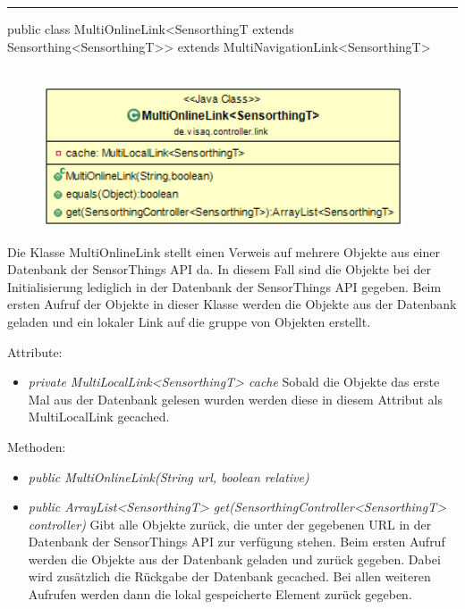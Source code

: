 \rule{\textwidth}{0.4pt}
public class MultiOnlineLink<SensorthingT extends Sensorthing<SensorthingT>> extends MultiNavigationLink<SensorthingT>
\\\\
\begin{minipage}{0.5\textwidth}
    \begin{figure}[H]
        {\centering\includegraphics[width=0.95\textwidth]{media/backend/controller/classes/MultiOnlineLink.png}}
    \end{figure}
    \end{minipage} \hfill
\begin{minipage}{0.5\textwidth}
    Die Klasse MultiOnlineLink stellt einen Verweis auf mehrere Objekte aus einer Datenbank der \gls{SensorThings API} da.
    In diesem Fall sind die Objekte bei der Initialisierung lediglich in der Datenbank der \gls{SensorThings API} gegeben.
    Beim ersten Aufruf der Objekte in dieser Klasse werden die Objekte aus der Datenbank geladen und ein lokaler Link auf die gruppe von Objekten erstellt.
\end{minipage}

Attribute:
\begin{itemize}
    \item \emph{private MultiLocalLink<SensorthingT> cache} Sobald die Objekte das erste Mal aus der Datenbank gelesen wurden werden diese in diesem Attribut als MultiLocalLink gecached.
\end{itemize}
Methoden:
\begin{itemize}
    \item \emph{public MultiOnlineLink(String url, boolean relative)}
    \relativeDescription
    \item \emph{public ArrayList<SensorthingT> get(SensorthingController<SensorthingT> controller)}
    Gibt alle Objekte zurück, die unter der gegebenen URL in der Datenbank der \gls{SensorThings API} zur verfügung stehen.
    Beim ersten Aufruf werden die Objekte aus der Datenbank geladen und zurück gegeben.
    Dabei wird zusätzlich die Rückgabe der Datenbank gecached.
    Bei allen weiteren Aufrufen werden dann die lokal gespeicherte Element zurück gegeben.
\end{itemize}